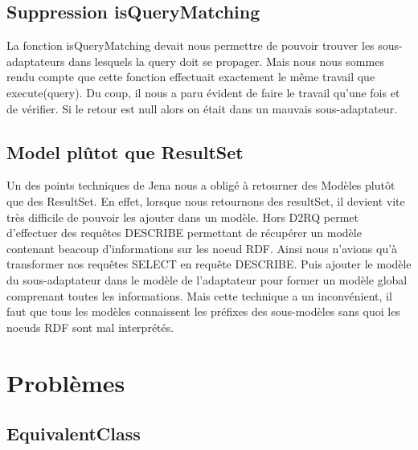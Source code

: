 \documentclass[12pt]{article}
\begin{document}
\subsection{Suppression isQueryMatching}

	La fonction isQueryMatching devait nous permettre de pouvoir trouver les sous-adaptateurs dans lesquels la query doit se propager. Mais nous nous sommes rendu compte que cette fonction effectuait exactement le même travail que execute(query). Du coup, il nous a paru évident de faire le travail qu'une fois et de vérifier. Si le retour est null alors on était dans un mauvais sous-adaptateur.

\subsection{Model plûtot que ResultSet}

	Un des points techniques de Jena nous a obligé à retourner des Modèles plutôt que des ResultSet. En effet, lorsque nous retournons des resultSet, il devient vite très difficile de pouvoir les ajouter dans un modèle. Hors D2RQ permet d'effectuer des requêtes DESCRIBE permettant de récupérer un modèle contenant beacoup d'informations sur les noeud RDF. Ainsi nous n'avions qu'à transformer nos requêtes SELECT en requête DESCRIBE. Puis ajouter le modèle du sous-adaptateur dans le modèle de l'adaptateur pour former un modèle global comprenant toutes les informations. Mais cette technique a un inconvénient, il faut que tous les modèles connaissent les préfixes des sous-modèles sans quoi les noeuds RDF sont mal interprétés.

\section{Problèmes}

\subsection{EquivalentClass}
\end{document}
